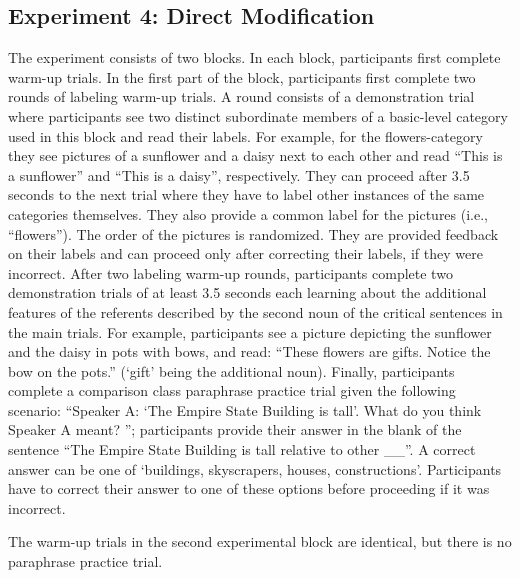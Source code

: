 \documentclass[a4paper,man,natbib]{apa6}
\begin{document}
\subsection{Experiment 4: Direct Modification}
The experiment consists of two blocks. In each block, participants first complete warm-up trials. In the first part of the block, participants first complete two rounds of labeling warm-up trials. A round consists of a demonstration trial where participants see two distinct subordinate members of a basic-level category used in this block and read their labels. For example, for the flowers-category they see pictures of a sunflower and a daisy next to each other and read “This is a sunflower” and “This is a daisy”, respectively. They can proceed after 3.5 seconds to the next trial where they have to label other instances of the same categories themselves. They also provide a common label for the pictures (i.e., “flowers”). The order of the pictures is randomized. They are provided feedback on their labels and can proceed only after correcting their labels, if they were incorrect.  After two labeling warm-up rounds, participants complete two demonstration trials of at least 3.5 seconds each learning about the additional features of the referents described by the second noun of the critical sentences in the main trials. For example, participants see a picture depicting the sunflower and the daisy in pots with bows, and read: “These flowers are gifts. Notice the bow on the pots.” (‘gift’ being the additional noun). Finally, participants complete a comparison class paraphrase practice trial given the following scenario: “Speaker A: ‘The Empire State Building is tall’. What do you think Speaker A meant? ”; participants provide their answer in the blank of the sentence “The Empire State Building is tall relative to other \_\_”. A correct answer can be one of ‘buildings, skyscrapers, houses, constructions’. Participants have to correct their answer to one of these options before proceeding if it was incorrect. 

The warm-up trials in the second experimental block are identical, but there is no paraphrase practice trial. 
\end{document}
